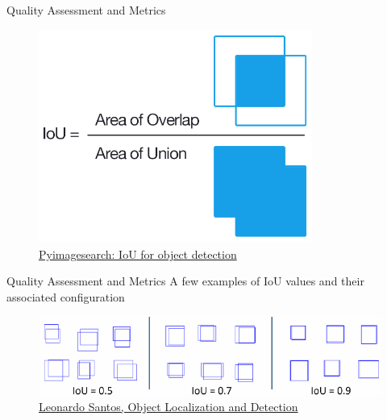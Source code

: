 \documentclass[handout]{beamer}
\begin{document}
\begin{frame}{Quality Assessment and Metrics}
\begin{figure}
\centering
\includegraphics[width=0.8\textwidth]{../media/iou_equation.png}
\caption{\href{http://www.pyimagesearch.com/2016/11/07/intersection-over-union-iou-for-object-detection/}{\color{blue}Pyimagesearch: IoU for object detection}}
\end{figure}
\end{frame}


\begin{frame}{Quality Assessment and Metrics}
A few examples of IoU values and their associated configuration
\begin{figure}
\centering
\includegraphics[width=\textwidth,keepaspectratio]{../media/iou-examples.png}
\caption{\href{https://leonardoaraujosantos.gitbooks.io/artificial-inteligence/content/object_localization_and_detection.html}{\color{blue}Leonardo Santos, Object Localization and Detection}}
\end{figure}
\end{frame}
\end{document}
